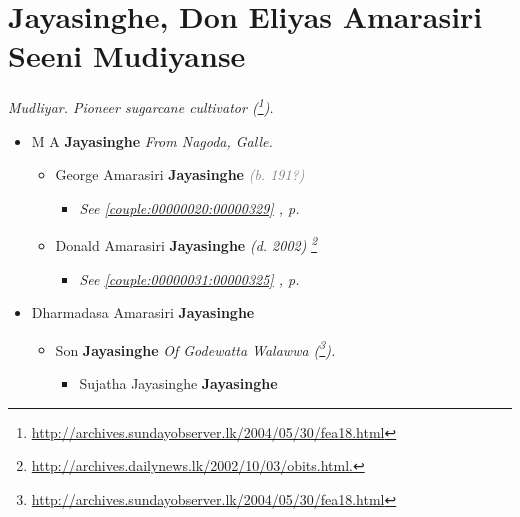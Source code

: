 \documentclass[10pt, openany]{book}
\begin{document}
\chapter{Jayasinghe, Don Eliyas Amarasiri Seeni Mudiyanse}
\label{00002581}
\textcolor{slmaroon}{\textit{Mudliyar. Pioneer sugarcane cultivator (\footnote{\url{http://archives.sundayobserver.lk/2004/05/30/fea18.html}}).}}
\begin{itemize}
\item{M A \textbf{Jayasinghe} \textcolor{slorange}{\textit{}} \textcolor{slmaroon}{\textit{From Nagoda, Galle.}}
\begin{itemize}
\item{George Amarasiri \textbf{Jayasinghe} \textcolor{gray}{\textit{(b. 191?)}}
\begin{itemize}
\item{\textcolor{slteal}{\textit{See  \autoref{couple:00000020:00000329} \textit{, p. \pageref{couple:00000020:00000329} }}}}
\end{itemize}
  }
\item{Donald Amarasiri \textbf{Jayasinghe} \textcolor{slorange}{\textit{(d. 2002)}} \textcolor{slmaroon}{\textit{\footnote{\url{http://archives.dailynews.lk/2002/10/03/obits.html.}}}}
\begin{itemize}
\item{\textcolor{slteal}{\textit{See  \autoref{couple:00000031:00000325} \textit{, p. \pageref{couple:00000031:00000325} }}}}
\end{itemize}
  }
\end{itemize}
  }
\item{Dharmadasa Amarasiri \textbf{Jayasinghe} \textcolor{slorange}{\textit{}}
\begin{itemize}
\item{Son \textbf{Jayasinghe} \textcolor{slorange}{\textit{}} \textcolor{slmaroon}{\textit{Of Godewatta Walawwa (\footnote{\url{http://archives.sundayobserver.lk/2004/05/30/fea18.html}}).}}
\begin{itemize}
\item{Sujatha Jayasinghe \textbf{Jayasinghe} \textcolor{slorange}{\textit{}}
  }
\end{itemize}
 }
\end{itemize}
  }
\end{itemize}
     
\end{document}
